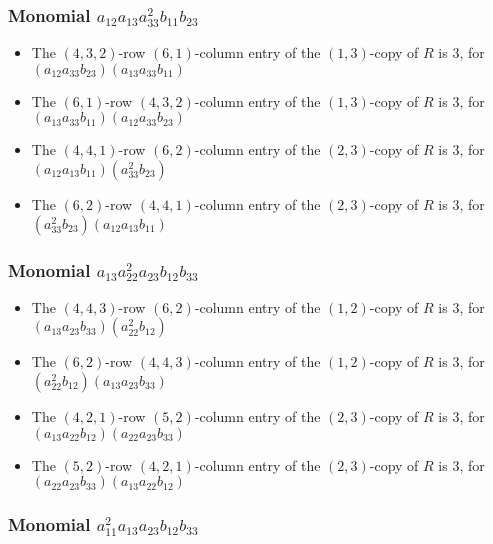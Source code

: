 \documentclass{article}
\begin{document}
\subsubsection{Monomial $ a_{12} a_{13} a_{33}^{2} b_{11} b_{23} $}

\begin{itemize}
\item The $(4, 3, 2)$-row $(6, 1)$-column entry of the $ \left(1, 3\right) $-copy of $R$ is $ 3 $, for $( a_{12} a_{33} b_{23} )( a_{13} a_{33} b_{11} )$ 
\item The $(6, 1)$-row $(4, 3, 2)$-column entry of the $ \left(1, 3\right) $-copy of $R$ is $ 3 $, for $( a_{13} a_{33} b_{11} )( a_{12} a_{33} b_{23} )$ 
\item The $(4, 4, 1)$-row $(6, 2)$-column entry of the $ \left(2, 3\right) $-copy of $R$ is $ 3 $, for $( a_{12} a_{13} b_{11} )( a_{33}^{2} b_{23} )$ 
\item The $(6, 2)$-row $(4, 4, 1)$-column entry of the $ \left(2, 3\right) $-copy of $R$ is $ 3 $, for $( a_{33}^{2} b_{23} )( a_{12} a_{13} b_{11} )$ 
\end{itemize}
\subsubsection{Monomial $ a_{13} a_{22}^{2} a_{23} b_{12} b_{33} $}

\begin{itemize}
\item The $(4, 4, 3)$-row $(6, 2)$-column entry of the $ \left(1, 2\right) $-copy of $R$ is $ 3 $, for $( a_{13} a_{23} b_{33} )( a_{22}^{2} b_{12} )$ 
\item The $(6, 2)$-row $(4, 4, 3)$-column entry of the $ \left(1, 2\right) $-copy of $R$ is $ 3 $, for $( a_{22}^{2} b_{12} )( a_{13} a_{23} b_{33} )$ 
\item The $(4, 2, 1)$-row $(5, 2)$-column entry of the $ \left(2, 3\right) $-copy of $R$ is $ 3 $, for $( a_{13} a_{22} b_{12} )( a_{22} a_{23} b_{33} )$ 
\item The $(5, 2)$-row $(4, 2, 1)$-column entry of the $ \left(2, 3\right) $-copy of $R$ is $ 3 $, for $( a_{22} a_{23} b_{33} )( a_{13} a_{22} b_{12} )$ 
\end{itemize}
\subsubsection{Monomial $ a_{11}^{2} a_{13} a_{23} b_{12} b_{33} $}
\end{document}

